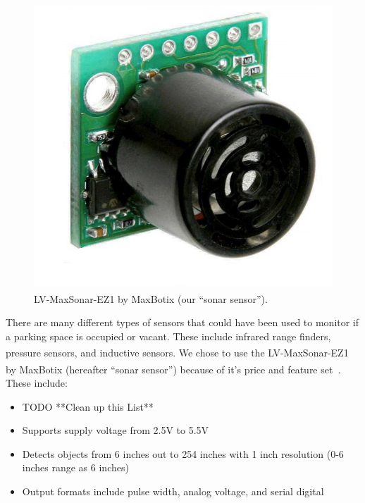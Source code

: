 \documentclass{acm_proc}
\begin{document}
\begin{figure}
    \begin{center}
		\includegraphics[width=\columnwidth]{figures/range_finder}
	\end{center}
	\caption{LV-MaxSonar\textsuperscript{\textregistered}-EZ1\textsuperscript{\texttrademark}
	by MaxBotix\textsuperscript{\textregistered} (our ``sonar sensor'').}
	\label{fig:range_finder}
\end{figure}

There are many different types of sensors that could have been used to
monitor if a parking space is occupied or vacant.  These include infrared
range finders, pressure sensors, and inductive sensors.
We chose to use the
LV-MaxSonar\textsuperscript{\textregistered}-EZ1\textsuperscript{\texttrademark}
by MaxBotix\textsuperscript{\textregistered} (hereafter ``sonar sensor'')
because of it's price and feature set~\cite{maxbotix:maxsonar-datasheet}.
These include:
\begin{itemize}
	\item TODO **Clean up this List**
	\item Supports supply voltage from 2.5V to 5.5V
	\item Detects objects from 6 inches out to 254 inches with 1 inch
	resolution (0-6 inches range as 6 inches)
	\item Output formats include pulse width, analog voltage, and serial digital
\end{itemize}
\end{document}
